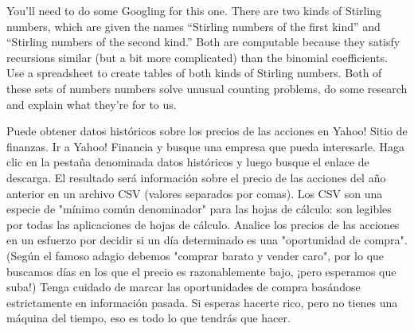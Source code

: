
You'll need to do some Googling for this one.  There are two kinds of Stirling numbers, which are given the names 
``Stirling numbers of the first kind'' and ``Stirling numbers of the second kind.''  Both are computable because they satisfy recursions similar (but a bit more complicated) than the binomial coefficients.  Use a spreadsheet to create tables of both kinds of Stirling numbers.  Both of these sets of numbers numbers solve unusual counting problems, do some research and explain what they're for to us.

Puede obtener datos históricos sobre los precios de las acciones en Yahoo! Sitio de finanzas. Ir a Yahoo! Financia y busque una empresa que pueda interesarle. Haga clic en la pestaña denominada datos históricos y luego busque el enlace de descarga. El resultado será información sobre el precio de las acciones del año anterior en un archivo CSV (valores separados por comas). Los CSV son una especie de "mínimo común denominador" para las hojas de cálculo: son legibles por todas las aplicaciones de hojas de cálculo. Analice los precios de las acciones en un esfuerzo por decidir si un día determinado es una "oportunidad de compra". (Según el famoso adagio debemos "comprar barato y vender caro", por lo que buscamos días en los que el precio es razonablemente bajo, ¡pero esperamos que suba!) Tenga cuidado de marcar las oportunidades de compra basándose estrictamente en información pasada. Si esperas hacerte rico, pero no tienes una máquina del tiempo, eso es todo lo que tendrás que hacer.